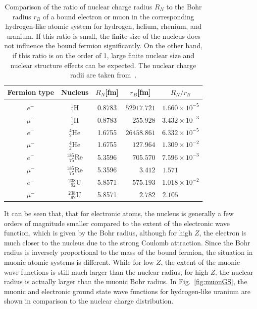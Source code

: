 \begin{table}
\caption{\label{tab:nucl_radii}
Comparison of the ratio of nuclear charge radius $R_N$ to the Bohr radius $r_B$ of a bound electron or muon in the corresponding hydrogen-like atomic system for hydrogen, helium, rhenium, and uranium. If this ratio is small, the finite size of the nucleus does not influence the bound fermion significantly. On the other hand, if this ratio is on the order of 1, large finite nuclear size and nuclear structure effects can be expected. The nuclear charge radii are taken from~\cite{Angeli2013}.}
\centering
\begin{tabular}{ccccc}
Fermion type & Nucleus & $R_N$[fm]&$r_B$[fm]&$R_N/r_B$\\\hline\\[-5pt]
$e^-$&$^1_1$H&0.8783&$52917.721$&$1.660\times 10^{-5}$\\[3pt]
$\mu^-$&$^1_1$H&0.8783&$\phantom{11}255.928$&$3.432\times 10^{-3}$\\[15pt]
$e^-$&$^4_2$He&1.6755&$26458.861$&$6.332\times 10^{-5}$\\[3pt]
$\mu^-$&$^4_2$He&1.6755&$\phantom{11}127.964$&$1.309\times 10^{-2}$\\[15pt]
$e^-$&$^{185}_{\phantom{1}75}$Re&5.3596&$\phantom{11}705.570$&$7.596\times 10^{-3}$\\[3pt]
$\mu^-$&$^{185}_{\phantom{1}75}$Re&5.3596&$\phantom{1111}3.412$&$1.571\phantom{111111}$\\[15pt]
$e^-$&$^{238}_{\phantom{1}92}$U&5.8571&$\phantom{11}575.193$&$1.018\times 10^{-2}$\\[3pt]
$\mu^-$&$^{238}_{\phantom{1}92}$U&5.8571&$\phantom{1111}2.782$&$2.105\phantom{111111}$
\end{tabular}
\end{table}
%
%
It can be seen that, that for electronic atoms, the nucleus is generally a few orders of magnitude smaller compared to the extent of the electronic wave function, which is given by the Bohr radius, although for high $Z$, the electron is much closer to the nucleus due to the strong Coulomb attraction. Since the Bohr radius is inversely proportional to the mass of the bound fermion, the situation in muonic atomic systems is different. While for low $Z$, the extent of the muonic wave functions is still much larger than the nuclear radius, for high $Z$, the nuclear radius is actually larger than the muonic Bohr radius. In Fig.~\ref{fig:muonGS}, the muonic and electronic ground state wave functions for hydrogen-like uranium are shown in comparison to the nuclear charge distribution.

